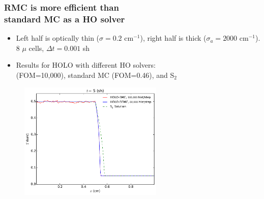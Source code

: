 \documentclass[xcolor=dvipsnames,hyperref={pdfpagelabels=false},unknownkeysallowed]{beamer}
\newcommand{\colg}[1]{{\color{ForestGreen} #1}}
\newcommand{\colb}[1]{{\color{blue} #1}}
\newcommand{\colG}[1]{{\color{Gray!110} #1}}
\newcommand{\colr}[1]{{\color{red} #1}}
\newlength{\wideitemsep}
\let\olditem\item
\renewcommand{\item}{\setlength{\itemsep}{\wideitemsep}\olditem}
\begin{document}
\begin{frame}
    \frametitle{RMC is more efficient than\\
 standard MC  as a HO solver }
{\addtolength\leftmargini{-0.345in}
    \centering
        \fontsize{10.0pt}{10.2pt}\selectfont
        \vspace{0.1in}
        \begin{itemize}
            \item Left half is optically thin ($\sigma\!=\!0.2$ cm$^{-1}$),
                right half is thick ($\sigma_a\!=\!2000$ cm$^{-1}$). \colG{8 $\mu$ cells,
                $\Delta t = 0.001$ sh}
            \item Results for HOLO with different HO solvers:\\
                \vspace{0.03in}\colb{ECMC} (FOM=10,000),  \colr{ standard MC}
                (FOM=0.46), and \colg{ S$_2$}
        \end{itemize}
    \begin{figure}
        \vspace{-0.1in} \includegraphics[width=0.6099\textwidth]{two_mat_ho_compare.pdf}
    \centering
    \end{figure}
}
\end{frame}
\end{document}
